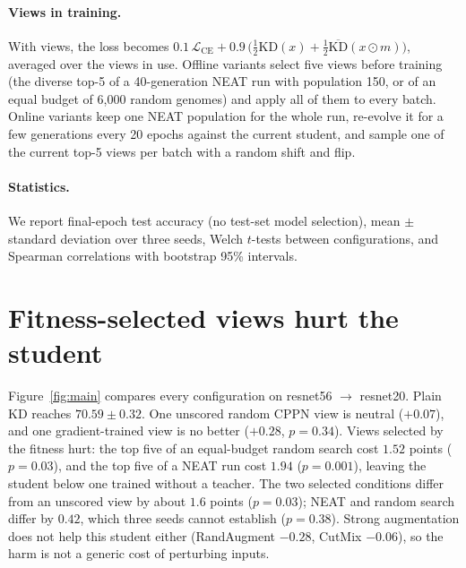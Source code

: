 \documentclass[sigconf,review,anonymous]{acmart}
\begin{document}
\paragraph{Views in training.} With views, the loss becomes
$0.1\,\mathcal{L}_{\mathrm{CE}} + 0.9\,\big(\tfrac12 \mathrm{KD}(x) +
\tfrac12 \overline{\mathrm{KD}}(x\odot m)\big)$, averaged over the views in
use. Offline variants select five views before training (the diverse top-5
of a 40-generation NEAT run with population 150, or of an equal budget of
6{,}000 random genomes) and apply all of them to every batch. Online
variants keep one NEAT population for the whole run, re-evolve it for a few
generations every 20 epochs against the current student, and sample one of
the current top-5 views per batch with a random shift and flip.

\paragraph{Statistics.} We report final-epoch test accuracy (no test-set
model selection), mean $\pm$ standard deviation over three seeds, Welch
$t$-tests between configurations, and Spearman correlations with bootstrap
95\% intervals.

\begin{table}
\caption{Benchmark reproduction: final-epoch test top-1 on CIFAR-100,
ours (mean $\pm$ std, 3 seeds) and published~\cite{tian2020crd} in
parentheses.}
\label{tab:benchmark}
\scriptsize
\setlength{\tabcolsep}{3pt}

\end{table}

\section{Fitness-selected views hurt the student}
\label{sec:harm}

Figure~\ref{fig:main} compares every configuration on resnet56 $\to$
resnet20. Plain KD reaches $70.59\pm0.32$. One unscored random CPPN view is
neutral ($+0.07$), and one gradient-trained view is no better ($+0.28$,
$p=0.34$). Views selected by the fitness hurt: the top five of an
equal-budget random search cost $1.52$ points ($p=0.03$), and the top five
of a NEAT run cost $1.94$ ($p=0.001$), leaving the student below one
trained without a teacher. The two selected conditions differ from an
unscored view by about $1.6$ points ($p=0.03$); NEAT and random search
differ by $0.42$, which three seeds cannot establish ($p=0.38$). Strong
augmentation does not help this student either (RandAugment $-0.28$,
CutMix $-0.06$), so the harm is not a generic cost of perturbing inputs.
\end{document}
